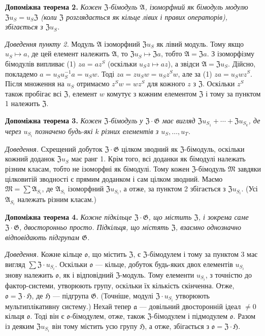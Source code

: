 \documentclass[11pt]{article}
\begin{document}
\noindent\textbf{Допоміжна теорема 2.} \emph{Кожен \(\mathfrak Z\)-бімодуль \(\mathfrak A\), ізоморфний як бімодуль модулю \(\mathfrak Zu_S=u_S\mathfrak Z\) (коли \(\mathfrak Z\) розглядається як кільце лівих і правих операторів), збігається з \(\mathfrak Zu_S\).}

\noindent\emph{Доведення пункту 2.} Модуль \(\mathfrak A\) ізоморфний \(\mathfrak Zu_S\) як лівий модуль. Тому якщо \(u_S\mapsto a\), де цей елемент належить \(\mathfrak A\), то \(\mathfrak Zu_S\mapsto\mathfrak Za\), тобто \(\mathfrak A=\mathfrak Za\). З ізоморфізму бімодулів випливає (1) \(za=az^S\) (оскільки \(u_Sz\mapsto az\)), а звідси \(\mathfrak A=\mathfrak Zu_S\). Дійсно, покладемо \(a=u_Su_S^{-1}a=u_Sw\). Тоді \(za=zu_Sw=u_Sz^Sw\), але за (1) \(za=u_Swz^S\). Після множення на \(u_S\) отримаємо \(z^Sw=wz^S\) для кожного \(z\) з \(\mathfrak Z\). Оскільки \(z^S\) також пробігає всі \(\mathfrak Z\), елемент \(w\) комутує з кожним елементом \(\mathfrak Z\) і тому за пунктом 1 належить \(\mathfrak Z\).

\noindent\textbf{Допоміжна теорема 3.} \emph{Кожен \(\mathfrak Z\)-бімодуль у \(\mathfrak Z\cdot\mathfrak G\) має вигляд \(\mathfrak Zu_{S_1}+\cdots+\mathfrak Zu_{S_k}\), де через \(u_{S_i}\) позначено будь-які \(k\) різних елементів з \(u_S,\ldots,u_T\).}

\noindent\emph{Доведення.} Схрещений добуток \(\mathfrak Z\cdot\mathfrak G\) цілком зводний як \(\mathfrak Z\)-бімодуль, оскільки кожний доданок \(\mathfrak Zu_S\) має ранг 1. Крім того, всі доданки як бімодулі належать різним класам, тобто не ізоморфні як бімодулі. Тому кожен \(\mathfrak Z\)-бімодуль \(\mathfrak M\) завдяки цілковитій зводності є прямим доданком і сам цілком зводний. Маємо \(\mathfrak M=\sum\mathfrak A_{S_i}\), де \(\mathfrak A_{S_i}\) ізоморфний \(\mathfrak Zu_{S_i}\), а отже, за пунктом 2 збігається з \(\mathfrak Zu_{S_i}\). (Усі \(\mathfrak A_{S_i}\) належать різним класам.)

\noindent\textbf{Допоміжна теорема 4.} \emph{Кожне підкільце \(\mathfrak Z\cdot\mathfrak G\), що містить \(\mathfrak Z\), і зокрема саме \(\mathfrak Z\cdot\mathfrak G\), двосторонньо просто. Підкільця, що містять \(\mathfrak Z\), взаємно однозначно відповідають підгрупам \(\mathfrak G\).}

\noindent\emph{Доведення.} Кожне кільце \(\mathfrak o\), що містить \(\mathfrak Z\), є \(\mathfrak Z\)-бімодулем і тому за пунктом 3 має вигляд \(\sum\mathfrak Z\cdot u_{S_i}\). Оскільки \(\mathfrak o\) --- кільце, добуток будь-яких двох елементів \(u_{S_i}\) знову належить \(\mathfrak o\), як і відповідний \(\mathfrak Z\)-модуль. Тому елементи \(u_{S_i}\), з точністю до фактор-системи, утворюють групу, оскільки їх кількість скінченна. Отже, \(\mathfrak o=\mathfrak Z\cdot\mathfrak H\), де \(\mathfrak H\) --- підгрупа \(\mathfrak G\). (Точніше, модулі \(\mathfrak Z\cdot u_{S_i}\) утворюють мультиплікативну систему.) Нехай тепер \(\mathfrak a\) --- довільний двосторонній ідеал \(\neq0\) кільця \(\mathfrak o\). Тоді він є \(\mathfrak o\)-бімодулем, отже, також \(\mathfrak Z\)-бімодулем і підмодулем \(\mathfrak o\). Разом із деяким \(\mathfrak Zu_{S_i}\) він тому містить усю групу \(\mathfrak H\), а отже, збігається з \(\mathfrak o=\mathfrak Z\cdot\mathfrak H\).
\end{document}
